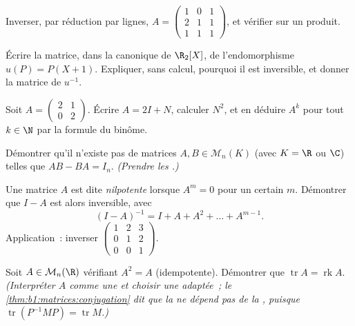 \begin{exercise}[$\star$]\label{exo:b1:matrices:3}
Inverser, par réduction par lignes, $A = \begin{pmatrix} 1 & 0 & 1\\ 2 & 1 &
1\\ 1 & 1 & 1 \end{pmatrix}$, et vérifier sur un produit.
\end{exercise}

\begin{exercise}[$\star$]\label{exo:b1:matrices:4}
Écrire la matrice, dans la  canonique de $\R_2[X]$, de
l'endomorphisme $u(P) = P(X + 1)$. Expliquer, sans calcul, pourquoi
il est inversible, et donner la matrice de $u^{-1}$.
\end{exercise}

\begin{exercise}[$\star\star$]\label{exo:b1:matrices:5}
Soit $A = \begin{pmatrix} 2 & 1 \\ 0 & 2\end{pmatrix}$. Écrire $A =
2I + N$, calculer $N^2$, et en déduire $A^k$ pour tout $k \in \N$ par la
formule du binôme.
\end{exercise}

\begin{exercise}[$\star\star$]\label{exo:b1:matrices:6}
Démontrer qu'il n'existe pas de matrices $A, B \in \mathcal{M}_n(K)$
(avec $K = \R$ ou $\C$) telles que $AB - BA = I_n$. \emph{(Prendre les
.)}
\end{exercise}

\begin{exercise}[$\star\star$]\label{exo:b1:matrices:7}
Une matrice $A$ est dite \emph{nilpotente} lorsque $A^m = 0$ pour un
certain $m$. Démontrer que $I - A$ est alors inversible, avec
\[
(I - A)^{-1} = I + A + A^2 + \dots + A^{m-1} .
\]
Application~: inverser $\begin{pmatrix} 1 & 2 & 3\\ 0 & 1 & 2\\ 0 & 0 &
1\end{pmatrix}$.
\end{exercise}

\begin{exercise}[$\star\star$]\label{exo:b1:matrices:8}
Soit $A \in \mathcal{M}_n(\R)$ vérifiant $A^2 = A$ (idempotente).
Démontrer que $\operatorname{tr} A = \operatorname{rk} A$.
\emph{(Interpréter $A$ comme une  et choisir une 
adaptée~; le \cref{thm:b1:matrices:conjugation} dit que la  ne
dépend pas de la , puisque $\operatorname{tr}(P^{-1}MP) =
\operatorname{tr} M$.)}
\end{exercise}

